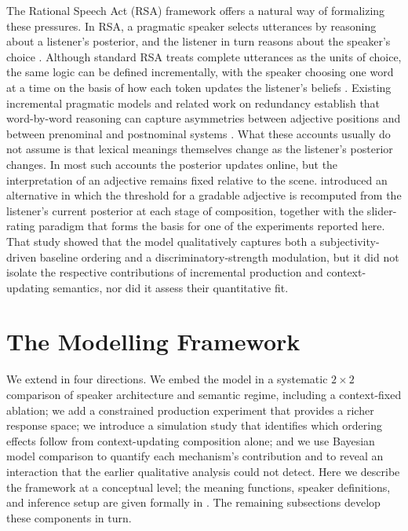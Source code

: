 \documentclass[man,floatsintext]{apa7}
\begin{document}
The Rational Speech Act (RSA) framework offers a natural way of formalizing these pressures.
In RSA, a pragmatic speaker selects utterances by reasoning about a listener's posterior, and the listener in turn reasons about the speaker's choice \citep{goodman2016pragmatic}.
Although standard RSA treats complete utterances as the units of choice, the same logic can be defined incrementally, with the speaker choosing one word at a time on the basis of how each token updates the listener's beliefs \citep{cohngordon2019incremental}.
Existing incremental pragmatic models and related work on redundancy establish that word-by-word reasoning can capture asymmetries between adjective positions and between prenominal and postnominal systems \citep{degen2020redundancy,rubio2021wordorder}.
What these accounts usually do not assume is that lexical meanings themselves change as the listener's posterior changes.
In most such accounts the posterior updates online, but the interpretation of an adjective remains fixed relative to the scene.
\citet{schlotterbeck2023incremental} introduced an alternative in which the threshold for a gradable adjective is recomputed from the listener's current posterior at each stage of composition, together with the slider-rating paradigm that forms the basis for one of the experiments reported here.
That study showed that the model qualitatively captures both a subjectivity-driven baseline ordering and a discriminatory-strength modulation, but it did not isolate the respective contributions of incremental production and context-updating semantics, nor did it assess their quantitative fit.

\section{The Modelling Framework}
\label{sec:framework}

We extend \citet{schlotterbeck2023incremental} in four directions.
We embed the model in a systematic $2 \times 2$ comparison of speaker architecture and semantic regime, including a context-fixed ablation; we add a constrained production experiment that provides a richer response space; we introduce a simulation study that identifies which ordering effects follow from context-updating composition alone; and we use Bayesian model comparison to quantify each mechanism's contribution and to reveal an interaction that the earlier qualitative analysis could not detect.
Here we describe the framework at a conceptual level; the meaning functions, speaker definitions, and inference setup are given formally in .
The remaining subsections develop these components in turn.
\end{document}
